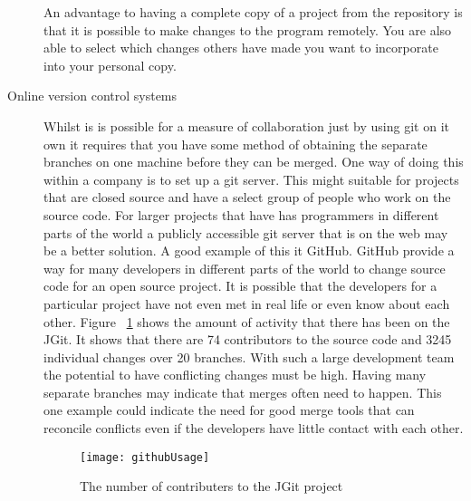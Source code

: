 \begin{description}
  An advantage to having a complete copy of a project from the repository is that it is possible to make changes to the program remotely.  You are also able to select which changes others have made you want to incorporate into your personal copy. 
  \item [Online version control systems]  
  Whilst is is possible for a measure of collaboration just by using git on it own it requires that you have some method of obtaining the separate branches on one machine before they can be merged.  One way of doing this within a company is to set up a git server.  This might suitable for projects that are closed source and have a select group of people who work on the source code.  For larger projects that have has programmers in different parts of the world a publicly accessible git server that is on the web may be a better solution. A good example of this it GitHub.  GitHub provide a way for many developers in different parts of the world to change source code for an open source project.  It is possible that the developers for a particular project have not even met in real life or even know about each other. Figure ~\ref{fig:bgUsage} shows the amount of activity that there has been on the JGit. It shows that there are 74 contributors to the source code and 3245 individual changes over 20 branches. With such a large development team the potential to have conflicting changes must be high. Having many separate branches may indicate that merges often need to happen. This one example could indicate the need for good merge tools that can reconcile conflicts even if the developers have little contact with each other.

  \begin{figure}[h]
   \begin{center}
    \texttt{[image: githubUsage]}
   \end{center}
   \caption{The number of contributers to the JGit project}
   \label{fig:bgUsage}
  \end{figure}


  
\end{description}

